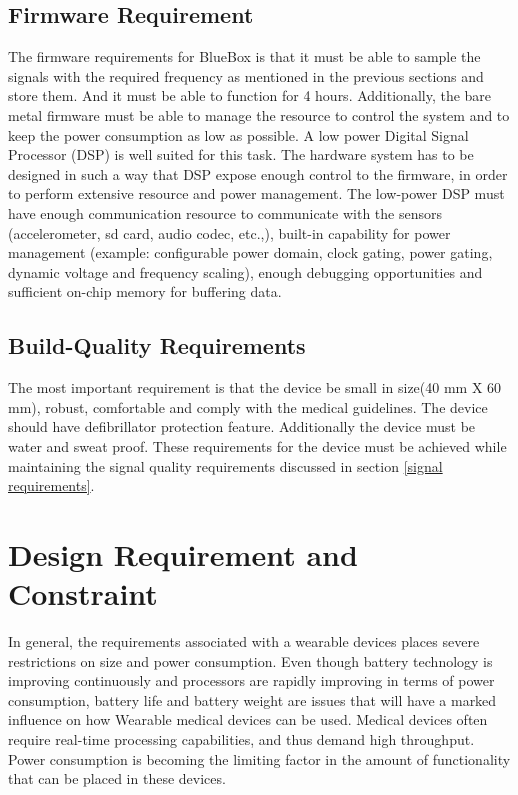 \subsection{Firmware Requirement }
The firmware requirements for BlueBox is that it must be able to sample the signals with the required frequency as mentioned in the previous sections and store them. And it must be able to function for 4 hours. Additionally, the bare metal firmware must be able to manage the resource to control the system and to keep the power consumption as low as possible. A low power Digital Signal Processor (DSP) is well suited for this task. The hardware system has to be designed in such a way that DSP expose enough control to the firmware, in order to perform extensive resource and power management. The low-power DSP must have enough communication resource to communicate with the sensors (accelerometer, sd card, audio codec, etc.,), built-in capability for power management (example: configurable power domain, clock gating, power gating, dynamic voltage and frequency scaling), enough debugging opportunities and sufficient on-chip memory for buffering data. 

\subsection {Build-Quality Requirements} 
The most important requirement is that the device be small in size(40 mm X 60 mm), robust, comfortable and comply with the medical guidelines. The device should have defibrillator protection feature. Additionally the device must be water and sweat proof. These requirements for the device must be achieved while maintaining the signal quality requirements discussed in section \ref{signal requirements}.  

\section {Design Requirement and Constraint} 
In general, the requirements associated with a wearable devices places severe restrictions on size and power consumption. Even though battery technology is improving continuously and processors are rapidly improving in terms of power consumption, battery life and battery weight are issues that will have a marked influence on how Wearable medical devices can be used. Medical devices often require real-time processing capabilities, and thus demand high throughput. Power consumption is becoming the limiting factor in the amount of functionality that can be placed in these devices. 

